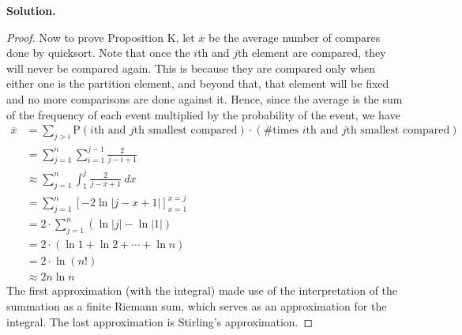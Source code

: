 \documentclass[12pt, a4paper]{article}
\newcommand{\prob}{\text{P}}
\newenvironment{sol}[1][Solution]
{\par\medskip\noindent \textbf{#1.} }
{\medskip}
\begin{document}
\begin{sol}
\begin{proof}
			Now to prove Proposition K, let $\overline{x}$ be the average number of compares
			done by quicksort. Note that once the $i$th and $j$th element are compared,
			they will never be compared again. This is because they are compared only when
			either one is the partition element, and beyond that, that element will be
			fixed and no more comparisons are done against it. Hence, since the
			average is the sum of the frequency of each event multiplied by the probability
			of the event, we have
			\begin{align*}
				\overline{x} &= \sum_{j>i}\prob(\text{$i$th and $j$th smallest compared})\cdot
				(\text{\# times $i$th and $j$th smallest compared})\\
				&=\sum_{j=1}^{n}\sum_{i=1}^{j-1}\frac{2}{j-i+1}\\
				&\approx \sum_{j=1}^{n}\int_{1}^{j}\frac{2}{j-x+1}\ dx\\
				&=\sum_{j=1}^{n}[-2\ln|j-x+1|]_{x=1}^{x=j}\\
				&=2\cdot \sum_{j=1}^{n}(\ln|j|-\ln|1|)\\
				&=2\cdot (\ln 1 + \ln 2 + \cdots+\ln n)\\
				&=2\cdot \ln(n!)\\
				&\approx 2n\ln n
			\end{align*}
			The first approximation (with the integral) made use of the interpretation
			of the summation as a finite Riemann sum, which serves as an approximation
			for the integral. The last approximation is Stirling's approximation.
		\end{proof}
	\end{sol}
	\pagebreak
	\printbibliography
\end{document}
